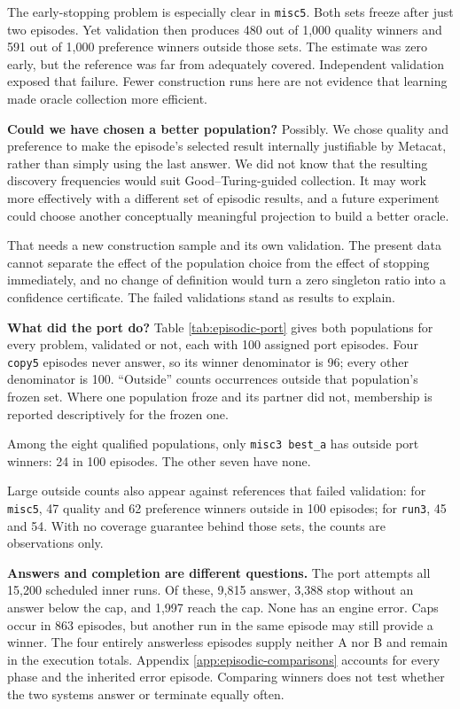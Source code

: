 \documentclass[10pt,letterpaper]{article}
\begin{document}
The early-stopping problem is especially clear in \texttt{misc5}. Both sets freeze after
just two episodes. Yet validation then produces 480 out of 1,000 quality winners and 591
out of 1,000 preference winners outside those sets. The estimate was zero early, but the
reference was far from adequately covered. Independent validation exposed that failure.
Fewer construction runs here are not evidence that learning made oracle collection more
efficient.

\textbf{Could we have chosen a better population?} Possibly. We chose quality and
preference to make the episode's selected result internally justifiable by Metacat, rather
than simply using the last answer. We did not know that the resulting discovery
frequencies would suit Good--Turing-guided collection. It may work more effectively with a
different set of episodic results, and a future experiment could choose another
conceptually meaningful projection to build a better oracle.

That needs a new construction sample and its own validation. The present data cannot
separate the effect of the population choice from the effect of stopping immediately, and
no change of definition would turn a zero singleton ratio into a confidence certificate.
The failed validations stand as results to explain.

\textbf{What did the port do?} Table \ref{tab:episodic-port} gives both populations for
every problem, validated or not, each with 100 assigned port episodes. Four \texttt{copy5}
episodes never answer, so its winner denominator is 96; every other denominator is 100.
``Outside'' counts occurrences outside that population's frozen set. Where one population
froze and its partner did not, membership is reported descriptively for the frozen one.



Among the eight qualified populations, only \texttt{misc3\ best\_a} has outside port
winners: 24 in 100 episodes. The other seven have none.

Large outside counts also appear against references that failed validation: for
\texttt{misc5}, 47 quality and 62 preference winners outside in 100 episodes; for
\texttt{run3}, 45 and 54. With no coverage guarantee behind those sets, the counts are
observations only.

\textbf{Answers and completion are different questions.} The port attempts all 15,200
scheduled inner runs. Of these, 9,815 answer, 3,388 stop without an answer below the cap,
and 1,997 reach the cap. None has an engine error. Caps occur in 863 episodes, but another
run in the same episode may still provide a winner. The four entirely answerless episodes
supply neither A nor B and remain in the execution totals. Appendix
\ref{app:episodic-comparisons} accounts for every phase and the inherited error episode.
Comparing winners does not test whether the two systems answer or terminate equally often.
\end{document}
